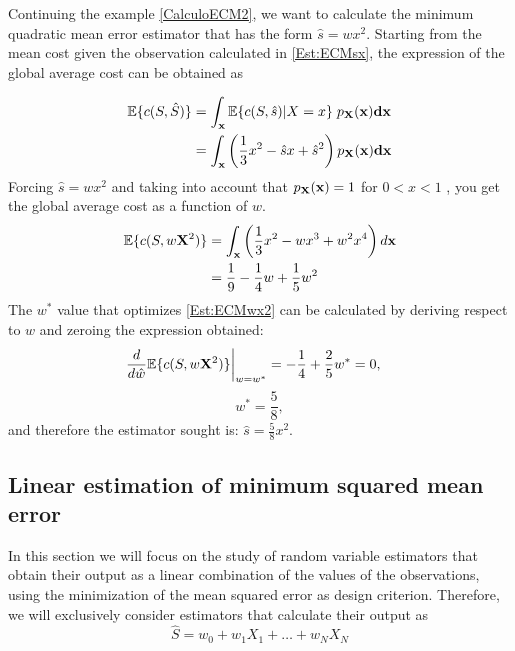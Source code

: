 \begin{example}
\label{CalculoECM_rest}
Continuing the example \ref{CalculoECM2}, we want to calculate the minimum quadratic mean error estimator that has the form $\hat{s} = wx^2$. Starting from the mean cost given the observation calculated in \eqref{Est:ECMsx}, the expression of the global average cost can be obtained as

\begin{equation}
\label{ec:coste_medio2}
\begin{split}
\mathbb{E}\{c(S,\hat S)\} 
   &= \int_{\bf x} \mathbb{E}\{c(S,\hat s)|X=x\} \;p_{\bf X}(\bf x) d{\bf x}  \\
   &= \int_{\bf x} \left(\frac{1}{3}x^2 -\hat{s}x +\hat{s}^2 \right) 
                   p_{\bf X}(\bf x) d{\bf x}
\end{split}
\end{equation}
Forcing $\hat{s} = wx^2$ and taking into account that $p_{\bf X}({\bf x})=1$ for $ 0<x<1$ , you get the global average cost as a function of $w$.
\begin{align}
\mathbb{E}\{c(S,w{\bf X}^2)\} 
   & = \int_{\bf x} \left(\frac{1}{3}x^2 - wx^3 + w^2x^4 \right) d{\bf x} \\
   & = \frac{1}{9} - \frac{1}{4} w + \frac{1}{5} w^2
\label{Est:ECMwx2}
\end{align}
The $w^*$ value that optimizes \eqref{Est:ECMwx2} can be calculated by deriving respect to $w$ and zeroing the expression obtained:
\begin{align}
\left. \frac{d}{d\hat{w}} \mathbb{E}\{c(S,w{\bf X}^2)\} \right|_{w=w^*} 
    &= - \frac{1}{4} + \frac{2}{5} w^* =0,
\end{align}
\begin{equation}
\label{eq:sopt_58}
w^* = \frac{5}{8},
\end{equation}
and therefore the estimator sought is: $\hat{s} = \frac{5}{8}x^2$.

\end{example}\vspace{0.4cm}


\subsection{Linear estimation of minimum squared mean error}
\label{sec:est_lineal}

In this section we will focus on the study of random variable estimators that obtain their output as a linear combination of the values of the observations, using the minimization of the mean squared error as design criterion. Therefore, we will exclusively consider estimators that calculate their output as
\begin{equation}
\hat S = w_0 + w_1 X_1 + \dots + w_N X_N
\end{equation}


